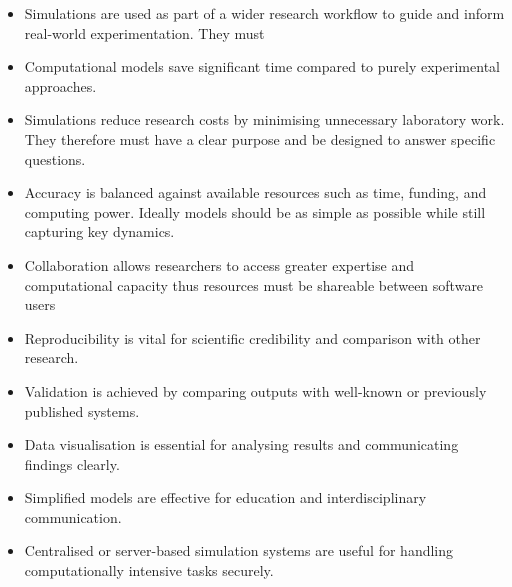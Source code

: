 \begin{itemize}
  \item Simulations are used as part of a wider research workflow to guide and inform real-world experimentation. They must 
  \item Computational models save significant time compared to purely experimental approaches.
  \item Simulations reduce research costs by minimising unnecessary laboratory work. They therefore must have a clear purpose and be designed to answer specific questions.
  \item Accuracy is balanced against available resources such as time, funding, and computing power. Ideally models should be as simple as possible while still capturing key dynamics.
  \item Collaboration allows researchers to access greater expertise and computational capacity thus resources must be shareable between software users
  \item Reproducibility is vital for scientific credibility and comparison with other research.
  \item Validation is achieved by comparing outputs with well-known or previously published systems.
  \item Data visualisation is essential for analysing results and communicating findings clearly.
  \item Simplified models are effective for education and interdisciplinary communication.
  \item Centralised or server-based simulation systems are useful for handling computationally intensive tasks securely.
\end{itemize}

